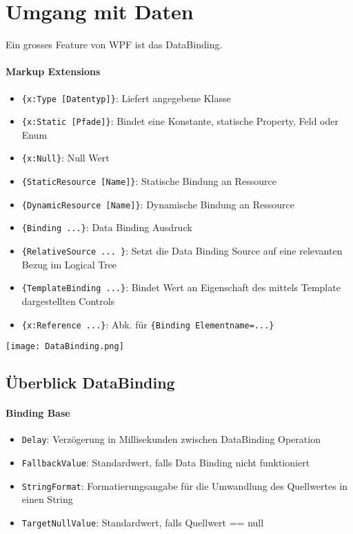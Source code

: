 \section{Umgang mit Daten}
Ein grosses Feature von WPF ist das DataBinding. 
\paragraph{Markup Extensions}
\begin{itemize}
\item \verb+{x:Type [Datentyp]}+: Liefert angegebene Klasse
\item \verb+{x:Static [Pfade]}+: Bindet eine Konstante, statische Property, Feld oder Enum
\item \verb+{x:Null}+: Null Wert
\item \verb+{StaticResource [Name]}+: Statische Bindung an Ressource
\item \verb+{DynamicResource [Name]}+: Dynamische Bindung an Ressource
\item \verb+{Binding ...}+: Data Binding Ausdruck
\item \verb+{RelativeSource ... }+: Setzt die Data Binding Source auf eine relevanten Bezug im Logical Tree
\item \verb+{TemplateBinding ...}+: Bindet Wert an Eigenschaft des mittels Template dargestellten Controls
\item \verb+{x:Reference ...}+: Abk. für \verb+{Binding Elementname=...}+
\end{itemize}
\texttt{[image: DataBinding.png]}
\subsection{Überblick DataBinding}
\paragraph{Binding Base}
\begin{itemize}
\item \verb+Delay+: Verzögerung in Millisekunden zwischen DataBinding Operation
\item \verb+FallbackValue+: Standardwert, falls Data Binding nicht funktioniert
\item \verb+StringFormat+: Formatierungsangabe für die Umwandlung des Quellwertes in einen String
\item \verb+TargetNullValue+: Standardwert, falls Quellwert == null
\end{itemize}
